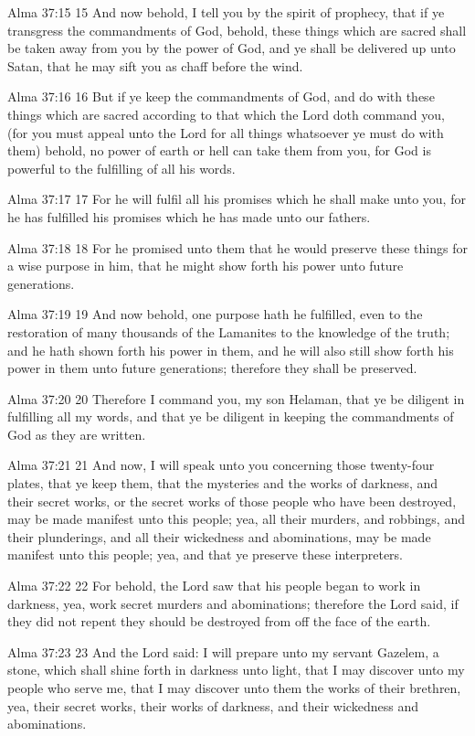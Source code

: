 Alma 37:15
 15 And now behold, I tell you by the spirit of prophecy, that if
ye transgress the commandments of God, behold, these things which
are sacred shall be taken away from you by the power of God, and
ye shall be delivered up unto Satan, that he may sift you as
chaff before the wind.

Alma 37:16
 16 But if ye keep the commandments of God, and do with these
things which are sacred according to that which the Lord doth
command you, (for you must appeal unto the Lord for all things
whatsoever ye must do with them) behold, no power of earth or
hell can take them from you, for God is powerful to the
fulfilling of all his words.

Alma 37:17
 17 For he will fulfil all his promises which he shall make unto
you, for he has fulfilled his promises which he has made unto our
fathers.

Alma 37:18
 18 For he promised unto them that he would preserve these things
for a wise purpose in him, that he might show forth his power
unto future generations.

Alma 37:19
 19 And now behold, one purpose hath he fulfilled, even to the
restoration of many thousands of the Lamanites to the knowledge
of the truth; and he hath shown forth his power in them, and he
will also still show forth his power in them unto future
generations; therefore they shall be preserved.

Alma 37:20
 20 Therefore I command you, my son Helaman, that ye be diligent
in fulfilling all my words, and that ye be diligent in keeping
the commandments of God as they are written.

Alma 37:21
 21 And now, I will speak unto you concerning those twenty-four
plates, that ye keep them, that the mysteries and the works of
darkness, and their secret works, or the secret works of those
people who have been destroyed, may be made manifest unto this
people; yea, all their murders, and robbings, and their
plunderings, and all their wickedness and abominations, may be
made manifest unto this people; yea, and that ye preserve these
interpreters.

Alma 37:22
 22 For behold, the Lord saw that his people began to work in
darkness, yea, work secret murders and abominations; therefore
the Lord said, if they did not repent they should be destroyed
from off the face of the earth.

Alma 37:23
 23 And the Lord said: I will prepare unto my servant Gazelem, a
stone, which shall shine forth in darkness unto light, that I may
discover unto my people who serve me, that I may discover unto
them the works of their brethren, yea, their secret works, their
works of darkness, and their wickedness and abominations.

